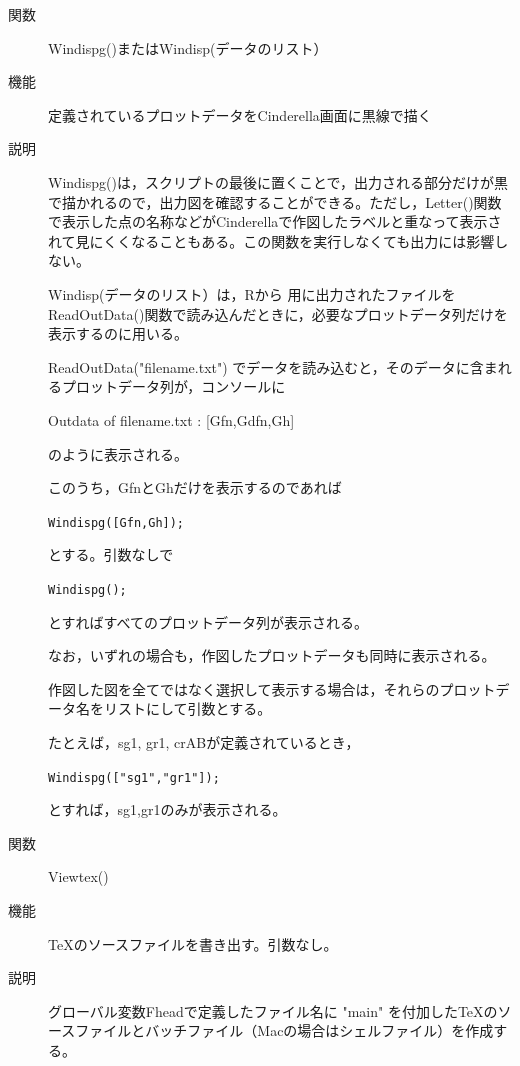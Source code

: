\documentclass[papersize,a4paper,10pt,uplatex]{jsarticle}
\begin{document}
\begin{description}
\vspace{\baselineskip}
\hypertarget{windispg}{}
\item[関数]Windispg()またはWindisp(データのリスト）
\item[機能]定義されているプロットデータをCinderella画面に黒線で描く
\item[説明]Windispg()は，スクリプトの最後に置くことで，出力される部分だけが黒で描かれるので，出力図を確認することができる。ただし，Letter()関数で表示した点の名称などがCinderellaで作図したラベルと重なって表示されて見にくくなることもある。この関数を実行しなくても出力には影響しない。

Windisp(データのリスト）は，Rから \ketcindy 用に出力されたファイルを ReadOutData()関数で読み込んだときに，必要なプロットデータ列だけを表示するのに用いる。

ReadOutData("filename.txt") でデータを読み込むと，そのデータに含まれるプロットデータ列が，コンソールに

\hspace{10mm}Outdata of filename.txt : [Gfn,Gdfn,Gh] 

のように表示される。

このうち，GfnとGhだけを表示するのであれば

\hspace{10mm}\verb|Windispg([Gfn,Gh]);|

とする。引数なしで
 
\hspace{10mm}\verb|Windispg();|

とすればすべてのプロットデータ列が表示される。

なお，いずれの場合も，作図したプロットデータも同時に表示される。

作図した図を全てではなく選択して表示する場合は，それらのプロットデータ名をリストにして引数とする。

たとえば，sg1, gr1, crABが定義されているとき，

\hspace{10mm}\verb|Windispg(["sg1","gr1"]);|

とすれば，sg1,gr1のみが表示される。


\vspace{\baselineskip}
\hypertarget{viewtex}{}
\item[関数]Viewtex()
\item[機能]\TeX のソースファイルを書き出す。引数なし。
\item[説明]グローバル変数Fheadで定義したファイル名に "main" を付加した\TeX のソースファイルとバッチファイル（Macの場合はシェルファイル）を作成する。
 

\end{description}
\end{document}
